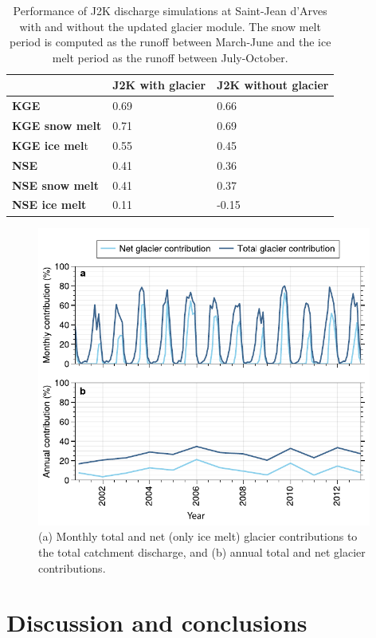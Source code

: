\begin{table}[h!]
\centering
\begin{tabular}{ | m{3cm} | m{3cm} | m{3.5cm}|} 
 \hline
   & \textbf{J2K with glacier} & \textbf{J2K without glacier} \\
 \hline \textbf{KGE}  & 0.69  & 0.66 \\
 \hline \textbf{KGE snow melt}  & 0.71  & 0.69 \\
 \hline \textbf{KGE ice mel}t  & 0.55  & 0.45 \\
 \hline \textbf{NSE}  & 0.41  & 0.36 \\
 \hline \textbf{NSE snow melt}  & 0.41  & 0.37 \\
 \hline \textbf{NSE ice melt}  & 0.11  & -0.15 \\
\hline
\end{tabular}
\caption{Performance of J2K discharge simulations at Saint-Jean d'Arves with and without the updated glacier module. The snow melt period is computed as the runoff between March-June and the ice melt period as the runoff between July-October.}
\label{hydro:table1}
\end{table}

\begin{figure}[h]
\centering
\includegraphics[width=11cm]{Figures/hydro/Figure_6.pdf}
\caption{(a) Monthly total and net (only ice melt) glacier contributions to the total catchment discharge, and (b) annual total and net glacier contributions.} 
\label{hydro:fig6}
\end{figure}

\section{Discussion and conclusions}

